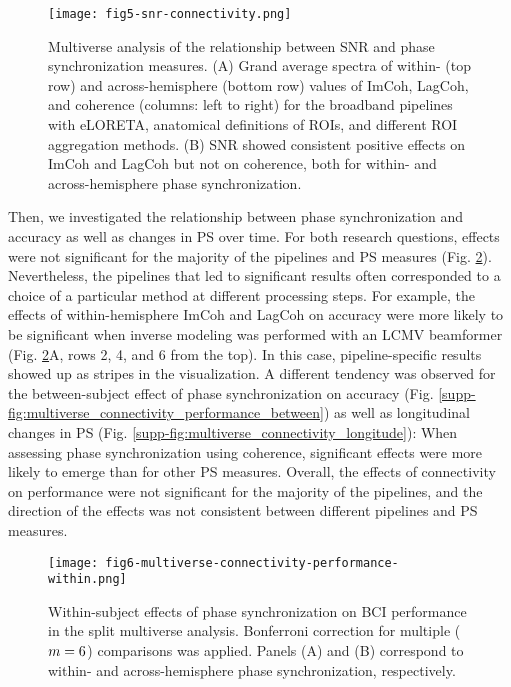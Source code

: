 \begin{figure}[htbp]
    \centering
    \texttt{[image: fig5-snr-connectivity.png]}
    \caption{Multiverse analysis of the relationship between SNR and phase synchronization measures. (A) Grand average spectra of within- (top row) and across-hemisphere (bottom row) values of ImCoh, LagCoh, and coherence (columns: left to right) for the broadband pipelines with eLORETA, anatomical definitions of ROIs, and different ROI aggregation methods. (B) SNR showed consistent positive effects on ImCoh and LagCoh but not on coherence, both for within- and across-hemisphere phase synchronization.}
    \label{fig:snr_connectivity}
\end{figure}

\medskip

Then, we investigated the relationship between phase synchronization and accuracy as well as changes in PS over time. For both research questions, effects were not significant for the majority of the pipelines and PS measures (Fig. \ref{fig:multiverse_connectivity_performance_within}). Nevertheless, the pipelines that led to significant results often corresponded to a choice of a particular method at different processing steps. For example, the effects of within-hemisphere ImCoh and LagCoh on accuracy were more likely to be significant when inverse modeling was performed with an LCMV beamformer (Fig. \ref{fig:multiverse_connectivity_performance_within}A, rows 2, 4, and 6 from the top). In this case, pipeline-specific results showed up as stripes in the visualization. A different tendency was observed for the between-subject effect of phase synchronization on accuracy (Fig. \ref{supp-fig:multiverse_connectivity_performance_between}) as well as longitudinal changes in PS (Fig. \ref{supp-fig:multiverse_connectivity_longitude}): When assessing phase synchronization using coherence, significant effects were more likely to emerge than for other PS measures. Overall, the effects of connectivity on performance were not significant for the majority of the pipelines, and the direction of the effects was not consistent between different pipelines and PS measures.

\begin{figure}[htbp]
    \centering
    \texttt{[image: fig6-multiverse-connectivity-performance-within.png]}
    \caption{Within-subject effects of phase synchronization on BCI performance in the split multiverse analysis. Bonferroni correction for multiple ($m = 6$) comparisons was applied. Panels (A) and (B) correspond to within- and across-hemisphere phase synchronization, respectively.}
    \label{fig:multiverse_connectivity_performance_within}
\end{figure}

